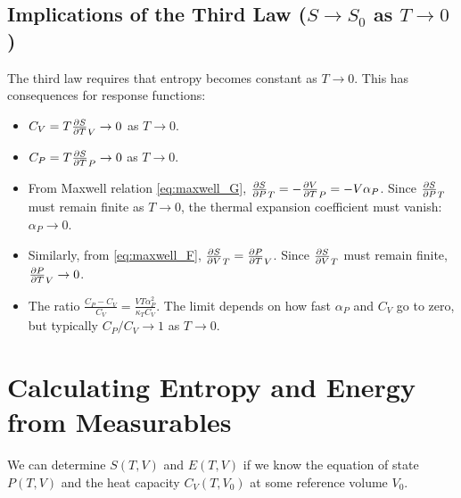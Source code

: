 \documentclass[10pt, letterpaper]{article}
\begin{document}
\subsection{Implications of the Third Law ($S \to S_0$ as $T \to 0$)}
The third law requires that entropy becomes constant as $T \to 0$. This has consequences for response functions:
\begin{itemize}
    \item $C_V = T \pdv{S}{T}_{V} \to 0$ as $T \to 0$.
    \item $C_P = T \pdv{S}{T}_{P} \to 0$ as $T \to 0$.
    \item From Maxwell relation \eqref{eq:maxwell_G}, $\pdv{S}{P}_{T} = -\pdv{V}{T}_{P} = -V \alpha_P$. Since $\pdv{S}{P}_{T}$ must remain finite as $T \to 0$, the thermal expansion coefficient must vanish: $\alpha_P \to 0$.
    \item Similarly, from \eqref{eq:maxwell_F}, $\pdv{S}{V}_{T} = \pdv{P}{T}_{V}$. Since $\pdv{S}{V}_{T}$ must remain finite, $\pdv{P}{T}_{V} \to 0$.
    \item The ratio $\frac{C_P - C_V}{C_V} = \frac{V T \alpha_P^2}{\kappa_T C_V}$. The limit depends on how fast $\alpha_P$ and $C_V$ go to zero, but typically $C_P/C_V \to 1$ as $T \to 0$.
\end{itemize}

\section{Calculating Entropy and Energy from Measurables}
We can determine $S(T,V)$ and $E(T,V)$ if we know the equation of state $P(T,V)$ and the heat capacity $C_V(T, V_0)$ at some reference volume $V_0$.
\end{document}
